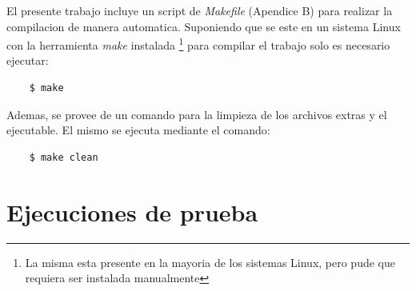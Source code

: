 \documentclass[10pt,spanish,a4paper,openany,notitlepage]{article}
\begin{document}
El presente trabajo incluye un script de \textit{Makefile} (Apendice B) para realizar la compilacion de manera automatica. Suponiendo que se este en un sistema Linux con la herramienta \textit{make} instalada \footnote{La misma esta presente en la mayoria de los sistemas Linux, pero pude que requiera ser instalada manualmente} para compilar el trabajo solo es necesario ejecutar:

\begin{framed}
\begin{verbatim}    $ make\end{verbatim}
\end{framed}

Ademas, se provee de un comando para la limpieza de los archivos extras y el ejecutable. El mismo se ejecuta mediante el comando:

\begin{framed}
\begin{verbatim}    $ make clean\end{verbatim}
\end{framed}

\section{Ejecuciones de prueba}
\end{document}
